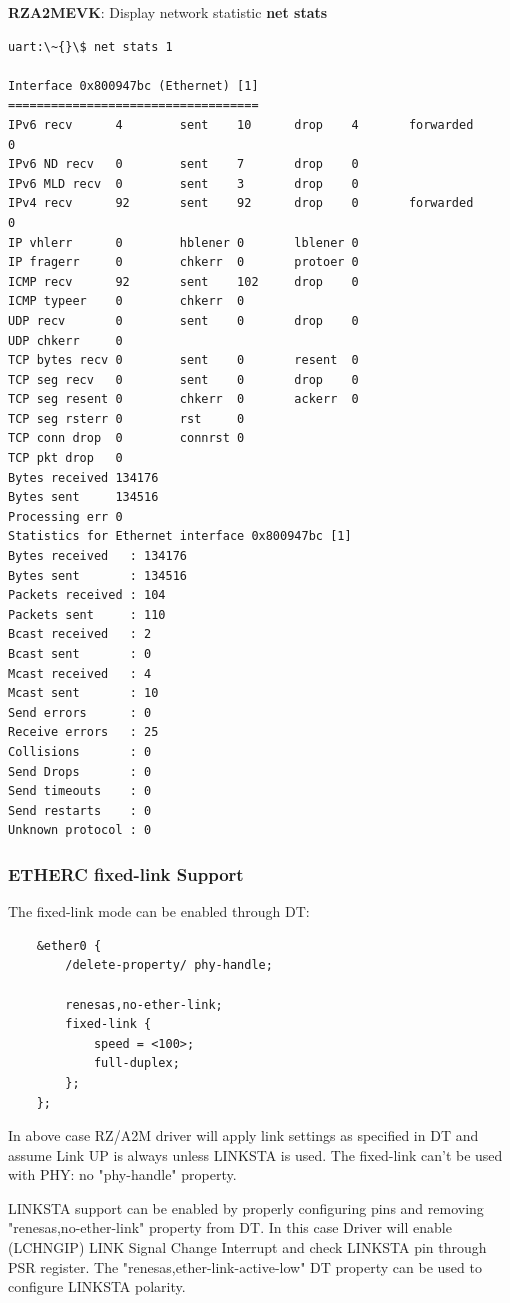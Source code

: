 \documentclass[11pt,a4paper,oneside]{article}
\begin{document}
\textbf{RZA2MEVK}: Display network statistic \textbf{net stats}
\begin{lstlisting}
uart:\~{}\$ net stats 1

Interface 0x800947bc (Ethernet) [1]
===================================
IPv6 recv      4        sent    10      drop    4       forwarded       0
IPv6 ND recv   0        sent    7       drop    0
IPv6 MLD recv  0        sent    3       drop    0
IPv4 recv      92       sent    92      drop    0       forwarded       0
IP vhlerr      0        hblener 0       lblener 0
IP fragerr     0        chkerr  0       protoer 0
ICMP recv      92       sent    102     drop    0
ICMP typeer    0        chkerr  0
UDP recv       0        sent    0       drop    0
UDP chkerr     0
TCP bytes recv 0        sent    0       resent  0
TCP seg recv   0        sent    0       drop    0
TCP seg resent 0        chkerr  0       ackerr  0
TCP seg rsterr 0        rst     0
TCP conn drop  0        connrst 0
TCP pkt drop   0
Bytes received 134176
Bytes sent     134516
Processing err 0
Statistics for Ethernet interface 0x800947bc [1]
Bytes received   : 134176
Bytes sent       : 134516
Packets received : 104
Packets sent     : 110
Bcast received   : 2
Bcast sent       : 0
Mcast received   : 4
Mcast sent       : 10
Send errors      : 0
Receive errors   : 25
Collisions       : 0
Send Drops       : 0
Send timeouts    : 0
Send restarts    : 0
Unknown protocol : 0
\end{lstlisting}

\subsubsection{ETHERC fixed-link Support}\label{eth-fixed-support}

The fixed-link mode can be enabled through DT:
\begin{lstlisting}
	&ether0 {
		/delete-property/ phy-handle;

		renesas,no-ether-link;
		fixed-link {
			speed = <100>;
			full-duplex;
		};
	};
\end{lstlisting}

In above case RZ/A2M driver will apply link settings as specified in DT and assume Link UP is always unless LINKSTA is used.
The fixed-link can't be used with PHY: no "phy-handle" property.

LINKSTA support can be enabled by properly configuring pins and removing "renesas,no-ether-link" property from DT.
In this case Driver will enable (LCHNGIP) LINK Signal Change Interrupt and check LINKSTA pin through PSR register.
The "renesas,ether-link-active-low" DT property can be used to configure LINKSTA polarity.
\end{document}
